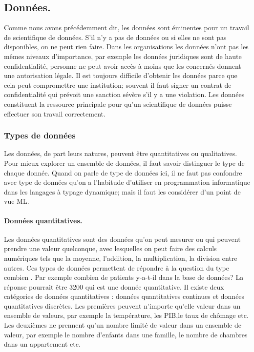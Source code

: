 \documentclass[12pt, french]{report}
\begin{document}
\subsection{Données.}

Comme nous avons précédemment dit, les données sont éminentes pour un travail de scientifique de données. S'il n'y a pas de données ou si elles ne sont pas disponibles, on ne peut rien faire. Dans les organisations les données n'ont pas les mêmes niveaux d'importance, par exemple les données juridiques sont de haute confidentialité, personne ne peut avoir accès à moins que les concernés donnent une autorisation légale. Il est toujours difficile d'obtenir les données parce que cela peut compromettre une institution; souvent il faut signer un contrat de confidentialité qui prévoit une sanction sévère s'il y a une violation.  Les données constituent la ressource principale pour qu'un scientifique de données puisse effectuer son travail correctement. 

\subsubsection{Types de données} 
Les données, de part leurs natures, peuvent être quantitatives ou qualitatives. Pour mieux explorer un ensemble de données, il faut savoir distinguer le type de chaque donnée. Quand on parle de type de données ici, il ne faut pas confondre avec type de données qu'on a l'habitude d'utiliser en programmation informatique dans les langages à typage dynamique; mais il faut les considérer d'un point de vue ML. 

\paragraph{Données quantitatives.} Les données quantitatives sont des données qu'on peut mesurer ou qui peuvent prendre une valeur quelconque, avec lesquelles on peut faire des calculs numériques tels que la moyenne, l'addition, la multiplication, la division entre autres. Ces types de données permettent de répondre à la question du type \guillemotleft combien \guillemotright. Par exemple combien de patients y-a-t-il dans la base de données? La réponse pourrait être 3200 qui est une donnée quantitative. Il existe deux catégories de données quantitatives : données quantitatives continues et données quantitatives discrètes. Les premières peuvent n'importe qu'elle valeur dans un ensemble de valeurs, par exemple la température, les PIB,le taux de chômage etc. Les deuxièmes ne prennent qu'un nombre limité de valeur dans un ensemble de valeur, par exemple le nombre d'enfants dans une famille, le nombre de chambres dans un appartement etc. 
    
\end{document}
